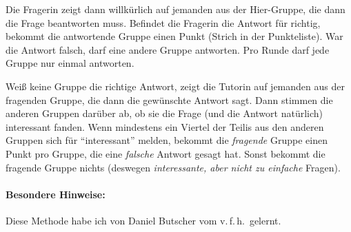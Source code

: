 Die Fragerin zeigt dann willkürlich auf jemanden aus der Hier-Gruppe, die dann die Frage beantworten muss. Befindet die Fragerin die Antwort für richtig, bekommt die antwortende Gruppe einen Punkt (Strich in der Punkteliste). War die Antwort falsch, darf eine andere Gruppe antworten. Pro Runde darf jede Gruppe nur einmal antworten.

Weiß keine Gruppe die richtige Antwort, zeigt die Tutorin auf jemanden aus der fragenden Gruppe, die dann die gewünschte Antwort sagt. Dann stimmen die anderen Gruppen darüber ab, ob sie die Frage (und die Antwort natürlich) interessant fanden. Wenn mindestens ein Viertel der Teilis aus den anderen Gruppen sich für "`interessant"' melden, bekommt die \emph{fragende} Gruppe einen Punkt pro Gruppe, die eine \emph{falsche} Antwort gesagt hat. Sonst bekommt die fragende Gruppe nichts (deswegen \emph{interessante, aber nicht zu einfache} Fragen).
\paragraph{Besondere Hinweise:} Diese Methode habe ich von Daniel Butscher vom v.\,f.\,h.~gelernt.
